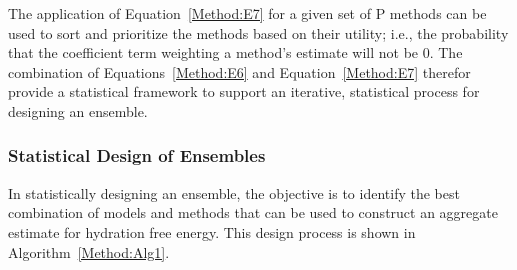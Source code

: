 \documentclass[12pt]{article}
\newcommand{\+}[1]{\ensuremath{\mathbf{#1}}}
\begin{document}
The application of Equation~\ref{Method:E7} for a given set of P methods can be used to sort and prioritize the methods based on their utility; i.e., the probability that the coefficient term weighting  a method's estimate will not be 0. The combination of Equations~\ref{Method:E6} and Equation~\ref{Method:E7} therefor provide a statistical framework to support an iterative, statistical process for designing an ensemble.
 
\subsubsection{Statistical Design of Ensembles}
\label{Method:StatEnsemble:Design}
In statistically designing an ensemble, the objective is to identify the best combination of models and methods that can be used to construct an aggregate estimate for hydration free energy. This design process is shown in Algorithm~\ref{Method:Alg1}. 
\end{document}
